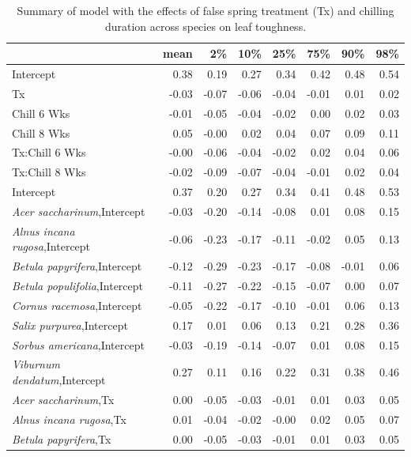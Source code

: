 \documentclass{article}\usepackage[]{graphicx}\usepackage[]{color}
\begin{document}
\newpage
\begin{longtable}{lrrrrrrr}
\caption{Summary of model with the effects of false spring treatment (Tx) and chilling duration across species on leaf toughness.} \\ 
  \hline
 & mean & 2\% & 10\% & 25\% & 75\% & 90\% & 98\% \\ 
  \hline \endhead  \hline
Intercept & 0.38 & 0.19 & 0.27 & 0.34 & 0.42 & 0.48 & 0.54 \\ 
  Tx & -0.03 & -0.07 & -0.06 & -0.04 & -0.01 & 0.01 & 0.02 \\ 
  Chill 6 Wks & -0.01 & -0.05 & -0.04 & -0.02 & 0.00 & 0.02 & 0.03 \\ 
  Chill 8 Wks & 0.05 & -0.00 & 0.02 & 0.04 & 0.07 & 0.09 & 0.11 \\ 
  Tx:Chill 6 Wks & -0.00 & -0.06 & -0.04 & -0.02 & 0.02 & 0.04 & 0.06 \\ 
  Tx:Chill 8 Wks & -0.02 & -0.09 & -0.07 & -0.04 & -0.01 & 0.02 & 0.04 \\ 
  Intercept & 0.37 & 0.20 & 0.27 & 0.34 & 0.41 & 0.48 & 0.53 \\ 
  \textit{Acer saccharinum},Intercept & -0.03 & -0.20 & -0.14 & -0.08 & 0.01 & 0.08 & 0.15 \\ 
  \textit{Alnus incana rugosa},Intercept & -0.06 & -0.23 & -0.17 & -0.11 & -0.02 & 0.05 & 0.13 \\ 
  \textit{Betula papyrifera},Intercept & -0.12 & -0.29 & -0.23 & -0.17 & -0.08 & -0.01 & 0.06 \\ 
  \textit{Betula populifolia},Intercept & -0.11 & -0.27 & -0.22 & -0.15 & -0.07 & 0.00 & 0.07 \\ 
  \textit{Cornus racemosa},Intercept & -0.05 & -0.22 & -0.17 & -0.10 & -0.01 & 0.06 & 0.13 \\ 
  \textit{Salix purpurea},Intercept & 0.17 & 0.01 & 0.06 & 0.13 & 0.21 & 0.28 & 0.36 \\ 
  \textit{Sorbus americana},Intercept & -0.03 & -0.19 & -0.14 & -0.07 & 0.01 & 0.08 & 0.15 \\ 
  \textit{Viburnum dendatum},Intercept & 0.27 & 0.11 & 0.16 & 0.22 & 0.31 & 0.38 & 0.46 \\ 
  \textit{Acer saccharinum},Tx & 0.00 & -0.05 & -0.03 & -0.01 & 0.01 & 0.03 & 0.05 \\ 
  \textit{Alnus incana rugosa},Tx & 0.01 & -0.04 & -0.02 & -0.00 & 0.02 & 0.05 & 0.07 \\ 
  \textit{Betula papyrifera},Tx & 0.00 & -0.05 & -0.03 & -0.01 & 0.01 & 0.03 & 0.05 \\ 

\end{longtable}
\end{document}
